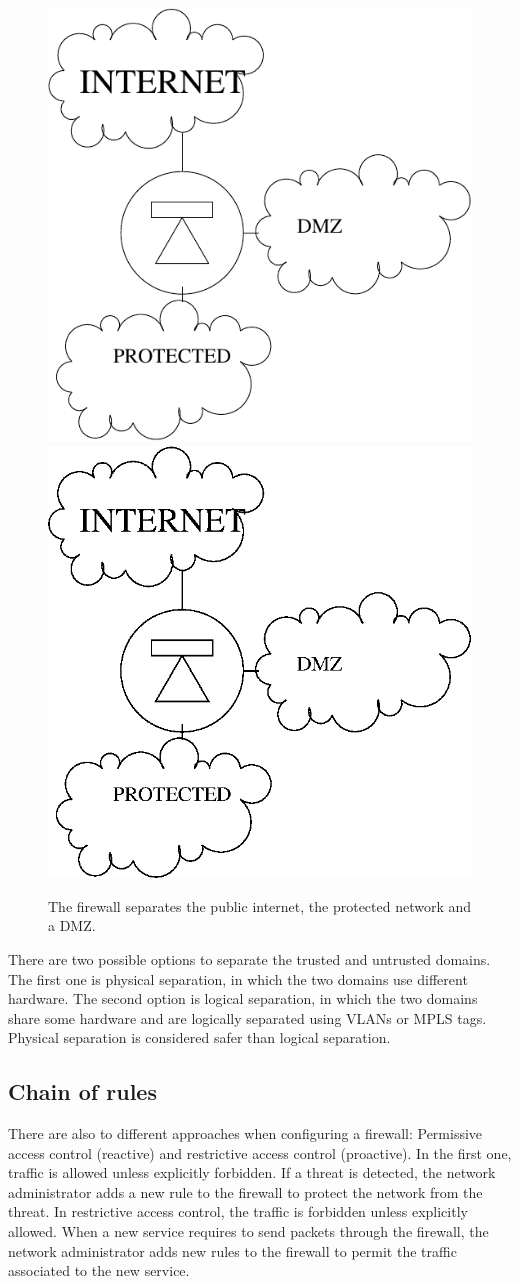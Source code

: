 \begin{figure}
\centering
\ifpdf
\includegraphics[width=0.5\linewidth]{Figures/DMZ.pdf}
\else
\includegraphics[width=0.5\linewidth]{Figures/DMZ.eps}
\fi
\caption{The firewall separates the public internet, the protected network and a DMZ.}
\label{fig:DMZ}
\end{figure}

There are two possible options to separate the trusted and untrusted domains.
The first one is physical separation, in which the two domains use different hardware.
The second option is logical separation, in which the two domains share some hardware and are logically separated using VLANs or MPLS tags.
Physical separation is considered safer than logical separation.

\subsection{Chain of rules}

There are also to different approaches when configuring a firewall: Permissive access control (reactive) and restrictive access control (proactive).
In the first one, traffic is allowed unless explicitly forbidden.
If a threat is detected, the network administrator adds a new rule to the firewall to protect the network from the threat.
In restrictive access control, the traffic is forbidden unless explicitly allowed.
When a new service requires to send packets through the firewall, the network administrator adds new rules to the firewall to permit the traffic associated to the new service.

